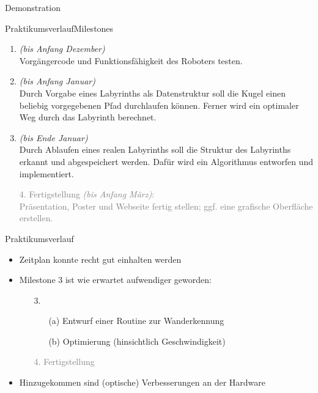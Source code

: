\documentclass{beamer}
\begin{document}
\begin{frame}[fragile,t]{Demonstration}
\end{frame}
\fi

\begin{frame}[fragile,t]{Praktikumsverlauf}{Milestones}
\begin{enumerate}[<+->]
 \item {} \textit{(bis Anfang Dezember)}\blue{:}\\
 Vorgängercode und Funktionsfähigkeit des Roboters testen.
 \item {} \textit{(bis Anfang Januar)}\blue{:}\\
 Durch Vorgabe eines Labyrinths als Datenstruktur soll die Kugel einen beliebig vorgegebenen Pfad durchlaufen können. Ferner wird ein optimaler Weg durch das Labyrinth berechnet.
 \item {} \textit{(bis Ende Januar)}\blue{:}\\
 Durch Ablaufen eines realen Labyrinths soll die Struktur des Labyrinths erkannt und abgespeichert werden. Dafür wird ein Algorithmus entworfen und implementiert.
 \item[\textcolor{gray}{4.}] \textcolor{gray}{Fertigstellung \textit{(bis Anfang März)}:\\
Präsentation, Poster und Webseite fertig stellen; ggf. eine grafische Oberfläche erstellen.
}
\end{enumerate}
\end{frame}

\begin{frame}[fragile,t]{Praktikumsverlauf}
\begin{itemize}[<+->]
\item Zeitplan konnte recht gut einhalten werden
\item Milestone 3 ist wie erwartet aufwendiger geworden:

\begin{enumerate}
 \item[3.] 
 \begin{enumerate}
 \item[(a)] Entwurf einer Routine zur Wanderkennung
 \item[(b)] Optimierung (hinsichtlich Geschwindigkeit)
 \end{enumerate}
 \item[\textcolor{gray}{4.}] \textcolor{gray}{Fertigstellung}
\end{enumerate}
\item Hinzugekommen sind (optische) Verbesserungen an der Hardware\\
\end{itemize}
\end{frame}
\end{document}
